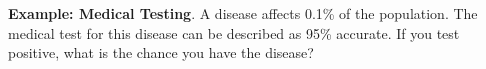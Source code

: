 \documentclass[11pt]{article}
\begin{document}
%
\vspace{.2in}

\noindent
{\bf Example: Medical Testing}. A disease affects 0.1\% of the population. The medical test for this disease can be described as 95\% accurate. If you test positive, what is the chance you have the disease?\\ 
\vspace{2cm}

\newpage

%
\end{document}
